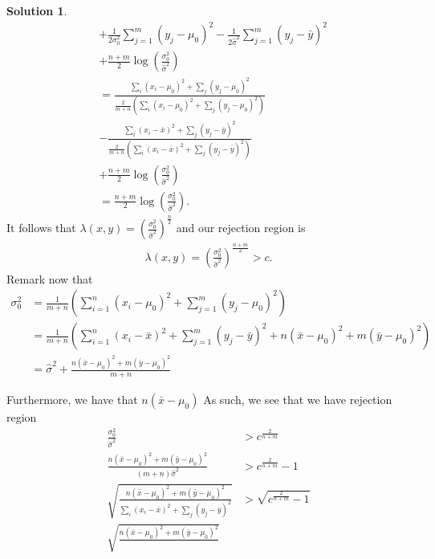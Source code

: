 \documentclass[11pt]{amsart}
\theoremstyle{definition}
\newtheorem{solution}[theorem]{Solution}
\numberwithin{equation}{section}
\begin{document}
\begin{solution}
\begin{align*}
        &+\frac{1}{2\sigma^2_0}\sum_{j=1}^m(y_j-\mu_0)^2-\frac{1}{2\hat\sigma^2}\sum_{j=1}^m(y_j-\bar y)^2\\
        &+\frac{n+m}{2}\log(\frac{\sigma_0^2}{\hat\sigma^2})\\
        &=\frac{\sum_{i}(x_i-\mu_0)^2+\sum_{j}(y_j-\mu_0)^2}{\frac{2}{m+n}(\sum_{i}(x_i-\mu_0)^2+\sum_{j}(y_j-\mu_0)^2)}\\
        &-\frac{\sum_{i}(x_i-\bar x)^2+\sum_{j}(y_j-\bar y)^2}{\frac{2}{m+n}(\sum_{i}(x_i-\bar x)^2+\sum_{j}(y_j-\bar y)^2)}\\
        &+\frac{n+m}{2}\log(\frac{\sigma_0^2}{\hat\sigma^2})\\
        &=\frac{n+m}{2}\log(\frac{\sigma_0^2}{\hat\sigma^2}).
    \end{align*}
    It follows that $\lambda(x,y)=\left(\frac{\sigma_0^2}{\hat\sigma^2}\right)^\frac{n}{2}$ and our rejection region is
    \begin{align*}
        \lambda(x,y)=\left(\frac{\sigma_0^2}{\hat\sigma^2}\right)^\frac{n+m}{2}>c.
    \end{align*}
    Remark now that
    \begin{align*}
        \sigma_0^2&=\frac{1}{m+n}\left(\sum_{i=1}^n(x_i-\mu_0)^2+\sum_{j=1}^m(y_j-\mu_0)^2\right)\\
        &=\frac{1}{m+n}\left(\sum_{i=1}^n(x_i-\bar x)^2+\sum_{j=1}^m(y_j-\bar y)^2+n(\bar x-\mu_0)^2+m(\bar y-\mu_0)^2\right)\\
        &=\hat\sigma^2+\frac{n(\bar x-\mu_0)^2+m(\bar y-\mu_0)^2}{m+n}
    \end{align*}
    
    Furthermore, we have that $n(\bar x-\mu_0)$
    As such, we see that we have rejection region
    \begin{align*}
        \frac{\sigma_0^2}{\hat\sigma^2}&>c^\frac{2}{n+m}\\
        \frac{n(\bar x-\mu_0)^2+m(\bar y-\mu_0)^2}{(m+n)\hat\sigma^2}&>c^\frac{2}{n+m}-1\\
        \sqrt{\frac{n(\bar x-\mu_0)^2+m(\bar y-\mu_0)^2}{\sum_{i}(x_i-\bar x)^2+\sum_{j}(y_j-\bar y)^2}}&>\sqrt{c^\frac{2}{n+m}-1}\\
        \sqrt{\frac{n(\bar x-\mu_0)^2+m(\bar y-\mu_0)^2}{}}
    \end{align*}
\end{solution}
\end{document}
